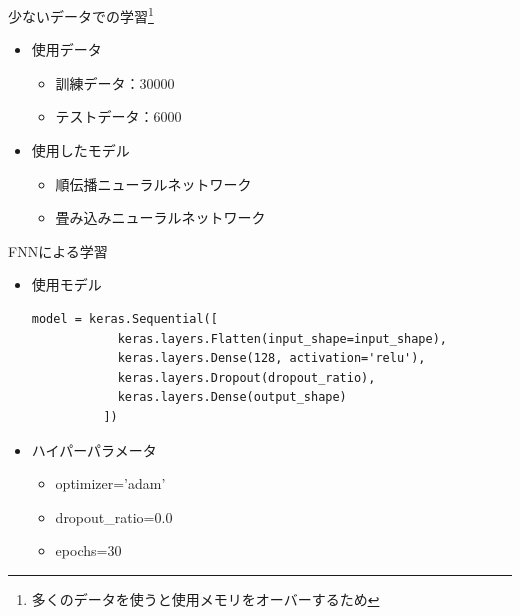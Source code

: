 \documentclass[dvipdfmx]{beamer}
\begin{document}
  \begin{frame}{少ないデータでの学習\footnote{多くのデータを使うと使用メモリをオーバーするため}}
    \begin{itemize}
      \item 使用データ
      \begin{itemize}
        \item 訓練データ：30000
        \item テストデータ：6000
      \end{itemize}
      \item 使用したモデル
      \begin{itemize}
        \item 順伝播ニューラルネットワーク
        \item 畳み込みニューラルネットワーク
      \end{itemize}
    \end{itemize}
  \end{frame}

  \begin{frame}[fragile]{FNNによる学習}
    \begin{itemize}
      \item 使用モデル\mbox{}\\
        \begin{lstlisting}[caption=generate\_simple\_fnn.py]
          model = keras.Sequential([
            keras.layers.Flatten(input_shape=input_shape),
            keras.layers.Dense(128, activation='relu'),
            keras.layers.Dropout(dropout_ratio),
            keras.layers.Dense(output_shape)
          ])
        \end{lstlisting}
      \item ハイパーパラメータ\mbox{}\\
      \begin{itemize}
        \item optimizer='adam'
        \item dropout\_ratio=0.0
        \item epochs=30
      \end{itemize}
    \end{itemize}
  \end{frame}
\end{document}
